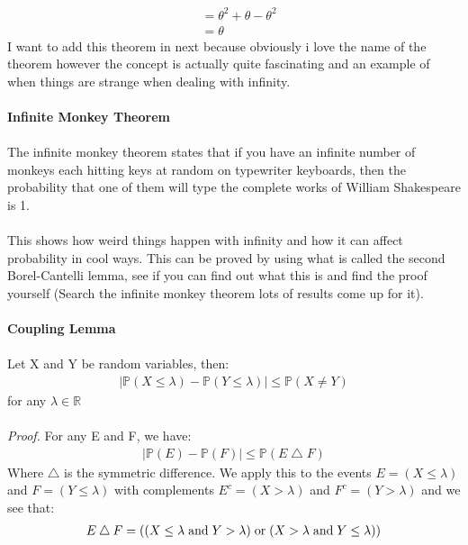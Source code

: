 \documentclass[,oneside]{article}
\begin{document}
\begin{enumerate}
\begin{align*}
&=\theta^2+\theta - \theta^2\\
&=\theta
\end{align*}
I want to add this theorem in next because obviously i love the name of the theorem however the concept is actually quite fascinating and an example of when things are strange when dealing with infinity.\\ \\
\textbf{Infinite Monkey Theorem}\\ \\
The infinite monkey theorem states that if you have an infinite number of monkeys each hitting keys at random on typewriter keyboards, then the probability that one of them will type the complete works of William Shakespeare is 1.\\ \\
This shows how weird things happen with infinity and how it can affect probability in cool ways. This can be proved by using what is called the second Borel-Cantelli lemma, see if you can find out what this is and find the proof yourself (Search the infinite monkey theorem lots of results come up for it).\\ \\
\textbf{Coupling Lemma}\\ \\
Let X and Y be random variables, then:
\begin{align*}
|\mathbb{P}(X \leq \lambda )-\mathbb{P}(Y \leq \lambda )| \leq \mathbb{P}(X \neq Y)
\end{align*}
for any $\lambda \in \mathbb{R}$\\ \\
\textit{Proof.} For any E and F, we have:
\begin{align*}
|\mathbb{P}(E)-\mathbb{P}(F)| \leq \mathbb{P}(E \bigtriangleup F)
\end{align*}
Where $\bigtriangleup$ is the symmetric difference. We apply this to the events $E=(X \leq \lambda)$ and $F=(Y \leq \lambda)$ with complements $E^c=(X > \lambda)$ and $F^c=(Y > \lambda)$ and we see that:
\begin{align*}
E \bigtriangleup F &= ((X \leq \lambda \hspace{0.1cm} \text{and} \hspace{0.1cm} Y > \lambda )\hspace{0.1cm} \text{or} \hspace{0.1cm}(X > \lambda \hspace{0.1cm} \text{and} \hspace{0.1cm} Y \leq \lambda ))\\

\end{align*}
\end{enumerate}
\end{document}

